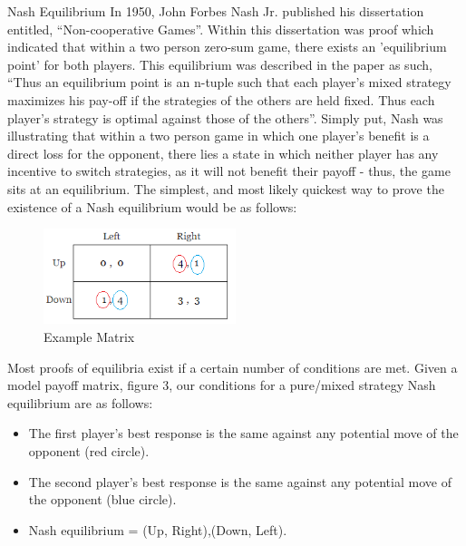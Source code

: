 \documentclass[12pt,a4paper]{article}
\makeatletter
\renewcommand\subsection{\@startsection {subsection}{1}{2mm}
                               {3pt plus 2pt minus 1pt}
                               {3pt plus 0pt}
                               {\normalfont\bfseries}}
\makeatother
\begin{document}
\subsection{Nash Equilibrium}
In 1950, John Forbes Nash Jr. published his dissertation entitled, “Non-cooperative Games”\cite{23}. Within this dissertation was proof which indicated that within a two person zero-sum game, there exists an 'equilibrium point' for both players. This equilibrium was described in the paper as such, “Thus an equilibrium point is an n-tuple such that each player's mixed strategy maximizes his pay-off if the strategies of the others are held fixed. Thus each player's strategy is optimal against those of the others”\cite[p.~3]{23}. Simply put, Nash was illustrating that within a two person game in which one player's benefit is a direct loss for the opponent, there lies a state in which neither player has any incentive to switch strategies, as it will not benefit their payoff - thus, the game sits at an equilibrium. The simplest, and most likely quickest way to prove the existence of a Nash equilibrium would be as follows:

\begin{figure}[H]
	\centering
		\includegraphics[width=0.5\textwidth]{ModelMatrix}
		\caption{Example Matrix}
\end{figure}

\noindent
Most proofs of equilibria exist if a certain number of conditions are met. Given a model payoff matrix, figure 3, our conditions for a pure/mixed strategy Nash equilibrium are as follows: \\

\begin{itemize}
  \item The first player's best response is the same against any potential move of the opponent (red circle).
  \item The second player's best response is the same against any potential move of the opponent (blue circle).
  \item Nash equilibrium = (Up, Right),(Down, Left). \\
\end{itemize}
\end{document}
